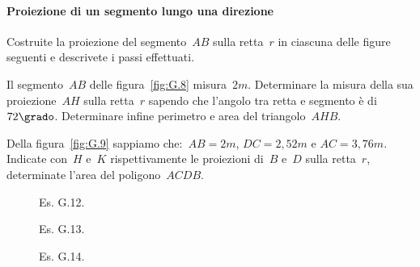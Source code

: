 \paragraph{Proiezione di un segmento lungo una direzione}
\begin{esercizio}
\label{ese:G.11}
Costruite la proiezione del segmento~$AB$ sulla retta~$r$ in ciascuna delle figure seguenti e descrivete i passi effettuati.
\begin{center}
 
\end{center}
\end{esercizio}

\begin{multicols}{2}
 \begin{esercizio}
\label{ese:G.12}
Il segmento~$AB$ delle figura~\ref{fig:G.8} misura~$2\unit{m}$. Determinare la misura della sua proiezione~$AH$ sulla retta~$r$ sapendo che l'angolo tra retta e
segmento è di~$72\grado$. Determinare infine perimetro e area del triangolo~$AHB$.
\end{esercizio}
\begin{esercizio}
\label{ese:G.13}
Della figura~\ref{fig:G.9} sappiamo che:~${AB}=2\unit{m}$, ${DC}=2,52\unit{m}$ e ${AC}=3,76\unit{m}$.
Indicate con~$H$ e~$K$ rispettivamente le proiezioni di~$B$ e~$D$ sulla retta~$r$, determinate l'area del poligono~$ACDB$.
\end{esercizio}
\end{multicols}

\begin{figure}[t]
 \begin{minipage}[t]{.25\textwidth}
 \centering
 
 \caption{Es. G.12.}\label{fig:G.8}
 \end{minipage}
 \begin{minipage}[t]{.45\textwidth}
 \centering
 
 \caption{Es. G.13.}\label{fig:G.9}
 \end{minipage}
 \begin{minipage}[t]{.25\textwidth}
 \centering
 
 \caption{Es. G.14.}\label{fig:G.10}
 \end{minipage}
\end{figure}

